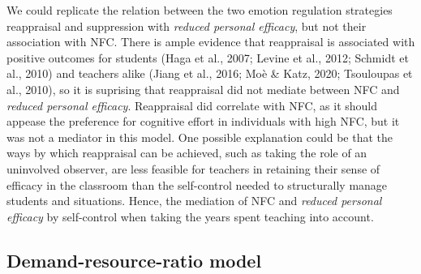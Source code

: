 \documentclass[
  english,
  man,floatsintext]{apa6}
\begin{document}
We could replicate the relation between the two emotion regulation strategies reappraisal and suppression with \emph{reduced personal efficacy}, but not their association with NFC.
There is ample evidence that reappraisal is associated with positive outcomes for students (Haga et al., 2007; Levine et al., 2012; Schmidt et al., 2010) and teachers alike (Jiang et al., 2016; Moè \& Katz, 2020; Tsouloupas et al., 2010), so it is suprising that reappraisal did not mediate between NFC and \emph{reduced personal efficacy}.
Reappraisal did correlate with NFC, as it should appease the preference for cognitive effort in individuals with high NFC, but it was not a mediator in this model.
One possible explanation could be that the ways by which reappraisal can be achieved, such as taking the role of an uninvolved observer, are less feasible for teachers in retaining their sense of efficacy in the classroom than the self-control needed to structurally manage students and situations.
Hence, the mediation of NFC and \emph{reduced personal efficacy} by self-control when taking the years spent teaching into account.

\hypertarget{demand-resource-ratio-model-1}{%
\subsection{Demand-resource-ratio model}\label{demand-resource-ratio-model-1}}
\end{document}
